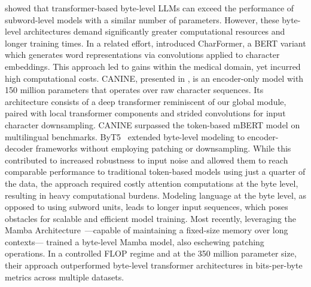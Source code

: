 \cite{Choe2019BridgingTG} showed that transformer-based byte-level LLMs can exceed the performance of subword-level models with a similar number of parameters. However, these byte-level architectures demand significantly greater computational resources and longer training times. In a related effort, \cite{el2020characterbert} introduced CharFormer, a BERT variant which generates word representations via convolutions applied to character embeddings. This approach led to gains within the medical domain, yet incurred high computational costs. CANINE, presented in \cite{clark2022canine}, is an encoder-only model with 150 million parameters that operates over raw character sequences. Its architecture consists of a deep transformer reminiscent of our global module, paired with local transformer components and strided convolutions for input character downsampling. CANINE surpassed the token-based mBERT model on multilingual benchmarks. ByT5~\citep{xue2022byt5} extended byte-level modeling to encoder-decoder frameworks without employing patching or downsampling. While this contributed to increased robustness to input noise and allowed them to reach comparable performance to traditional token-based models using just a quarter of the data, the approach required costly attention computations at the byte level, resulting in heavy computational burdens. Modeling language at the byte level, as opposed to using subword units, leads to longer input sequences, which poses obstacles for scalable and efficient model training. Most recently, leveraging the Mamba Architecture~\citep{gu2023mamba}—capable of maintaining a fixed-size memory over long contexts—\cite{wang2024mambabyte} trained a byte-level Mamba model, also eschewing patching operations. In a controlled FLOP regime and at the 350 million parameter size, their approach outperformed byte-level transformer architectures in bits-per-byte metrics across multiple datasets.

